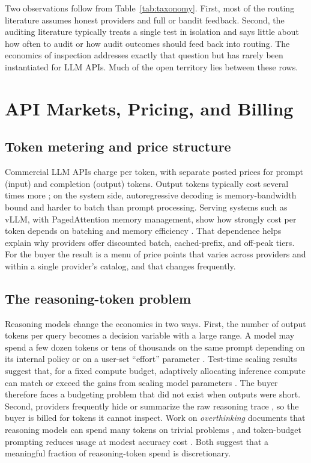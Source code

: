 \documentclass[sigconf]{acmart}
\begin{document}
Two observations follow from Table~\ref{tab:taxonomy}. First, most of the routing literature assumes honest providers and full or bandit feedback. Second, the auditing literature typically treats a single test in isolation and says little about how often to audit or how audit outcomes should feed back into routing. The economics of inspection addresses exactly that question but has rarely been instantiated for LLM APIs. Much of the open territory lies between these rows.

\section{API Markets, Pricing, and Billing}\label{api-markets-pricing-and-billing}

\subsection{Token metering and price structure}\label{token-metering-and-price-structure}

Commercial LLM APIs charge per token, with separate posted prices for prompt (input) and completion (output) tokens. Output tokens typically cost several times more \cite{anthropic2026pricing}; on the system side, autoregressive decoding is memory-bandwidth bound and harder to batch than prompt processing. Serving systems such as vLLM, with PagedAttention memory management, show how strongly cost per token depends on batching and memory efficiency \cite{kwon2023vllm}. That dependence helps explain why providers offer discounted batch, cached-prefix, and off-peak tiers. For the buyer the result is a menu of price points that varies across providers and within a single provider's catalog, and that changes frequently.

\subsection{The reasoning-token problem}\label{the-reasoning-token-problem}

Reasoning models change the economics in two ways. First, the number of output tokens per query becomes a decision variable with a large range. A model may spend a few dozen tokens or tens of thousands on the same prompt depending on its internal policy or on a user-set ``effort'' parameter \cite{openai2026reasoning}. Test-time scaling results suggest that, for a fixed compute budget, adaptively allocating inference compute can match or exceed the gains from scaling model parameters \cite{snell2024scaling}. The buyer therefore faces a budgeting problem that did not exist when outputs were short. Second, providers frequently hide or summarize the raw reasoning trace \cite{openai2024o1card}, so the buyer is billed for tokens it cannot inspect. Work on \emph{overthinking} documents that reasoning models can spend many tokens on trivial problems \cite{chen2024overthinking}, and token-budget prompting reduces usage at modest accuracy cost \cite{han2024tokenbudget}. Both suggest that a meaningful fraction of reasoning-token spend is discretionary.
\end{document}

